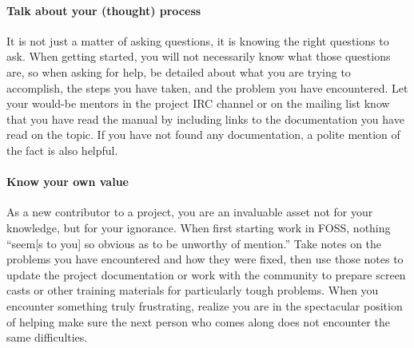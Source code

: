 \paragraph*{Talk about your (thought) process} It is not just a matter of asking questions, it is knowing the right questions to ask. When getting started, you will not necessarily know what those questions are, so when asking for help, be detailed about what you are trying to accomplish, the steps you have taken, and the problem you have encountered. Let your would-be mentors in the project IRC channel or on the mailing list know that you have read the manual by including links to the documentation you have read on the topic. If you have not found any documentation, a polite mention of the fact is also helpful.

\paragraph*{Know your own value} As a new contributor to a project, you are an invaluable asset not for your knowledge, but for your ignorance. When first starting work in FOSS, nothing ``seem[s to you] so obvious as to be unworthy of mention.'' Take notes on the problems you have encountered and how they were fixed, then use those notes to update the project documentation or work with the community to prepare screen casts or other training materials for particularly tough problems. When you encounter something truly frustrating, realize you are in the spectacular position of helping make sure the next person who comes along does not encounter the same difficulties.
